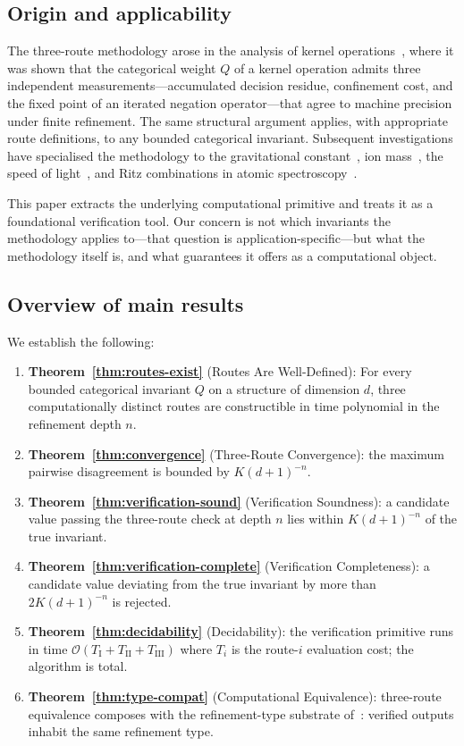 \documentclass[twocolumn,11pt,a4paper]{article}
\newcommand{\Inv}{Q}
\newcommand{\Depth}{n}
\newcommand{\Dim}{d}
\newcommand{\Tolb}{K}
\begin{document}
\subsection{Origin and applicability}

The three-route methodology arose in the analysis of kernel operations~\citep{sachikonye2026coe}, where it was shown that the categorical weight $\Inv$ of a kernel operation admits three independent measurements---accumulated decision residue, confinement cost, and the fixed point of an iterated negation operator---that agree to machine precision under finite refinement. The same structural argument applies, with appropriate route definitions, to any bounded categorical invariant. Subsequent investigations have specialised the methodology to the gravitational constant~\citep{sachikonye2026usd}, ion mass~\citep{sachikonye2026ion}, the speed of light~\citep{sachikonye2026mtm}, and Ritz combinations in atomic spectroscopy~\citep{sachikonye2026crs}.

This paper extracts the underlying computational primitive and treats it as a foundational verification tool. Our concern is not which invariants the methodology applies to---that question is application-specific---but what the methodology itself is, and what guarantees it offers as a computational object.

\subsection{Overview of main results}

We establish the following:
\begin{enumerate}[nosep,leftmargin=*]
\item \textbf{Theorem~\ref{thm:routes-exist}} (Routes Are Well-Defined): For every bounded categorical invariant $\Inv$ on a structure of dimension $\Dim$, three computationally distinct routes are constructible in time polynomial in the refinement depth $\Depth$.
\item \textbf{Theorem~\ref{thm:convergence}} (Three-Route Convergence): the maximum pairwise disagreement is bounded by $\Tolb(\Dim+1)^{-\Depth}$.
\item \textbf{Theorem~\ref{thm:verification-sound}} (Verification Soundness): a candidate value passing the three-route check at depth $\Depth$ lies within $\Tolb(\Dim+1)^{-\Depth}$ of the true invariant.
\item \textbf{Theorem~\ref{thm:verification-complete}} (Verification Completeness): a candidate value deviating from the true invariant by more than $2\Tolb(\Dim+1)^{-\Depth}$ is rejected.
\item \textbf{Theorem~\ref{thm:decidability}} (Decidability): the verification primitive runs in time $\mathcal{O}(T_{\mathrm{I}} + T_{\mathrm{II}} + T_{\mathrm{III}})$ where $T_i$ is the route-$i$ evaluation cost; the algorithm is total.
\item \textbf{Theorem~\ref{thm:type-compat}} (Computational Equivalence): three-route equivalence composes with the refinement-type substrate of~\citet{sachikonye2026refinementtypes}: verified outputs inhabit the same refinement type.
\end{enumerate}
\end{document}
